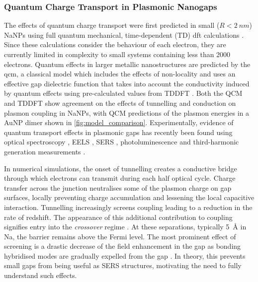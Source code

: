 \documentclass{article}
\begin{document}
\subsubsection{Quantum Charge Transport in Plasmonic Nanogaps}

The effects of quantum charge transport were first predicted in small ($R<\SI{2}{nm}$) NaNPs using full quantum mechanical, time-dependent (TD) \gls{dft} calculations \cite{zuloaga2009}. Since these calculations consider the behaviour of each electron, they are currently limited in complexity to small systems containing less than 2000 electrons. Quantum effects in larger metallic nanostructures are predicted by the \gls{qcm}, a classical model which includes the effects of non-locality and uses an effective gap dielectric function that takes into account the conductivity induced by quantum effects using pre-calculated values from TDDFT \cite{esteban2012}. Both the QCM and TDDFT show agreement on the effects of tunnelling and conduction on plasmon coupling in NaNPs, with QCM predictions of the plasmon energies in a AuNP dimer shown in \autoref{fig:model_comparison}. Experimentally, evidence of quantum transport effects in plasmonic gaps has recently been found using optical spectroscopy \cite{savage2012, cha2014, zhu2014}, EELS \cite{scholl2013}, SERS \cite{zhu2014}, photoluminescence \cite{kravtsov2014} and third-harmonic generation measurements \cite{hajisalem2014}.

In numerical simulations, the onset of tunnelling creates a conductive bridge through which electrons can transmit during each half optical cycle. Charge transfer across the junction neutralises some of the plasmon charge on gap surfaces, locally preventing charge accumulation and lessening the local capacitive interaction. Tunnelling increasingly screens coupling leading to a reduction in the rate of redshift. The appearance of this additional contribution to coupling signifies entry into the \emph{crossover} regime \cite{zuloaga2009}. At these separations, typically \SI{5}{\angstrom} in Na, the barrier remains above the Fermi level. The most prominent effect of screening is a drastic decrease of the field enhancement in the gap as bonding hybridised modes are gradually expelled from the gap \cite{zuloaga2009, esteban2012}. In theory, this prevents small gaps from being useful as SERS structures, motivating the need to fully understand such effects.
\end{document}
